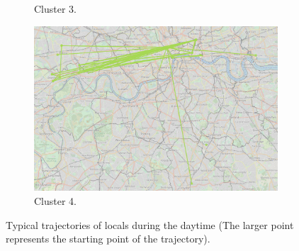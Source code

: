 \documentclass{article}
\theoremstyle{remark}
\begin{document}
\begin{figure}[!h]
\begin{subfigure}{0.6\textheight}
\caption{Cluster 3.}
\label{fig:daytime_locals_c3}
\end{subfigure}
\begin{subfigure}{0.6\textheight}
\centering
\includegraphics[width=0.4\linewidth]{figures/daytime_locals_c4.png}
\caption{Cluster 4.}
\label{fig:daytime_locals_c4}
\end{subfigure}

\caption{Typical trajectories of locals during the daytime (The larger point represents the starting point of the trajectory).}
\label{fig:sequences_daytime_locals}
\end{figure}
\end{document}
